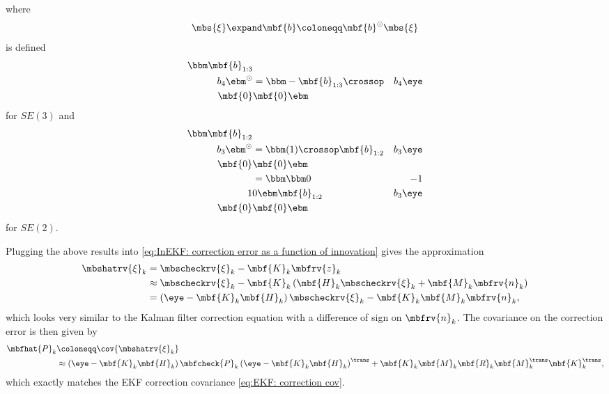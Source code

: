 \documentclass[nobib]{tufte-handout}
\begin{document}
    where 
    \begin{align}
        \mbs{\xi}\expand\mbf{b} \coloneqq \mbf{b}^{\odot}\mbs{\xi}\\
    \end{align}
    is defined 
    \begin{align}
        \bbm
            \mbf{b}_{1:3}\\
            b_{4}
        \ebm^{\odot}
        &=
        \bbm
            -\mbf{b}_{1:3}\crossop & b_{4}\eye \\ \mbf{0} & \mbf{0}
        \ebm
    \end{align}
    for $SE(3)$ and 
    \begin{align}
        \bbm
            \mbf{b}_{1:2}\\
            b_{3}
        \ebm^{\odot}
        &=
        \bbm
            (1)\crossop\mbf{b}_{1:2} & b_{3}\eye \\ \mbf{0} & \mbf{0}
        \ebm\\
        &=
        \bbm
            \bbm 0 & -1\\1 & 0 \ebm\mbf{b}_{1:2} & b_{3}\eye \\ \mbf{0} & \mbf{0}
        \ebm\\
    \end{align}
    for $SE(2)$.
    
    Plugging the above results into \eqref{eq:InEKF: correction error as a function of innovation} gives the approximation
    \begin{align}
        \mbshatrv{\xi}_{k} &= 
        \mbscheckrv{\xi}_{k} - \mbf{K}_{k}\mbfrv{z}_{k}\\
        &\approx
        \mbscheckrv{\xi}_{k} - \mbf{K}_{k}\left( \mbf{H}_{k}\mbscheckrv{\xi}_{k} + \mbf{M}_{k}\mbfrv{n}_{k} \right)\\
        &= \left( \eye - \mbf{K}_{k}\mbf{H}_{k} \right)\mbscheckrv{\xi}_{k} - \mbf{K}_{k}\mbf{M}_{k}\mbfrv{n}_{k},
    \end{align}
    which looks very similar to the Kalman filter correction equation with a difference of sign on $\mbfrv{n}_{k}$. The covariance on the correction error is then given by
    \begin{align}
        \mbfhat{P}_{k} &\coloneqq \cov{\mbshatrv{\xi}_{k}}\\
        &\approx \left( \eye - \mbf{K}_{k}\mbf{H}_{k} \right)\mbfcheck{P}_{k}\left( \eye - \mbf{K}_{k}\mbf{H}_{k} \right)^{\trans} + \mbf{K}_{k}\mbf{M}_{k}\mbf{R}_{k}\mbf{M}_{k}^{\trans}\mbf{K}_{k}^{\trans},
    \end{align}
    which exactly matches the EKF correction covariance \eqref{eq:EKF: correction cov}.
\end{document}
